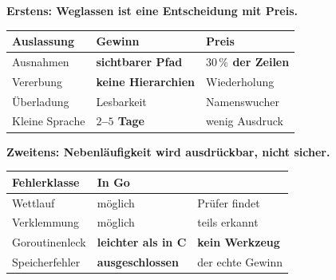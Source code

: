 \begin{merksatz}
\textbf{Erstens: Weglassen ist eine Entscheidung mit Preis.}

\begin{center}
{\small
\renewcommand{\arraystretch}{1.45}
\begin{tabular}{@{}P{2.8cm}P{2.6cm}P{2.6cm}@{}}
\toprule
\textbf{Auslassung} & \textbf{Gewinn} & \textbf{Preis}\\
\midrule
Ausnahmen & \textbf{sichtbarer Pfad} & \textcolor{akzent}{\textbf{$30\,\%$ der Zeilen}}\\
Vererbung & \textbf{keine Hierarchien} & \textcolor{akzent}{Wiederholung}\\
Überladung & Lesbarkeit & \textcolor{akzent}{Namenswucher}\\
Kleine Sprache & \textbf{$2$--$5$ Tage} & \textcolor{akzent}{wenig Ausdruck}\\
\bottomrule
\end{tabular}}
\end{center}

\begin{center}
\end{center}

\textbf{Zweitens: Nebenläufigkeit wird ausdrückbar, nicht sicher.}

\begin{center}
\renewcommand{\arraystretch}{1.45}
\begin{tabular}{@{}P{3.0cm}P{2.8cm}P{2.0cm}@{}}
\toprule
\textbf{Fehlerklasse} & \textbf{In Go} & \\
\midrule
Wettlauf & \textcolor{akzent}{möglich} & \textcolor{gruen}{Prüfer findet}\\
Verklemmung & \textcolor{akzent}{möglich} & \textcolor{mittel}{teils erkannt}\\
Goroutinenleck & \textcolor{akzent}{\textbf{leichter als in C}} & \textcolor{akzent}{\textbf{kein Werkzeug}}\\
Speicherfehler & \textcolor{gruen}{\textbf{ausgeschlossen}} & \textcolor{gruen}{der echte Gewinn}\\
\bottomrule
\end{tabular}
\end{center}

\begin{center}
\begin{minipage}{0.88\textwidth}
\end{minipage}
\end{center}


\end{merksatz}
